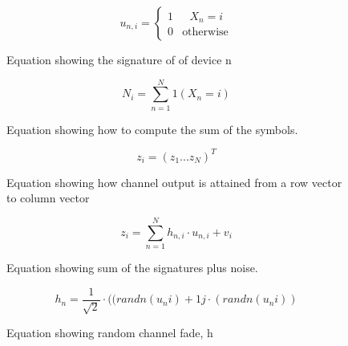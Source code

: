 \begin{figure}[H]
    \centering
\begin{equation}
  u_{n,i} =
    \begin{cases}
      1 & \text{ $X_n = i$}\\
      0 & \text{otherwise}
    \end{cases}       
\end{equation}
    \caption{Equation showing the signature of of device n}
    \label{fig:uni_otherwise}
\end{figure}

\begin{figure}[H]
    \centering
\begin{equation}
    N_i = \sum_{n=1}^{N} 1(X_n = i)
\end{equation}
    \caption{Equation showing how to compute the sum of the symbols. }
    \label{fig:sums}
\end{figure}


\begin{figure}[H]
    \centering
\begin{equation}
    z_i = (z_1...z_N)^T
\end{equation}
    \caption{Equation showing how channel output is attained from a row vector to column vector}
    \label{fig:my_label}
\end{figure}

\begin{figure}[H]
    \centering
\begin{equation}
    z_i = \sum_{n=1}^{N} h_{n,i} \cdot u_{n,i} + v_i
\end{equation}
    \caption{Equation showing sum of the signatures plus noise. }
    \label{fig:my_label}
\end{figure}

\begin{figure}[H]
    \centering
\begin{equation}
   h_n = \frac{1}{\sqrt{2}}\cdot((randn(u_ni)+1j\cdot(randn(u_ni))
\end{equation}
    \caption{Equation showing random channel fade, h }
    \label{fig:my_label}
\end{figure}






